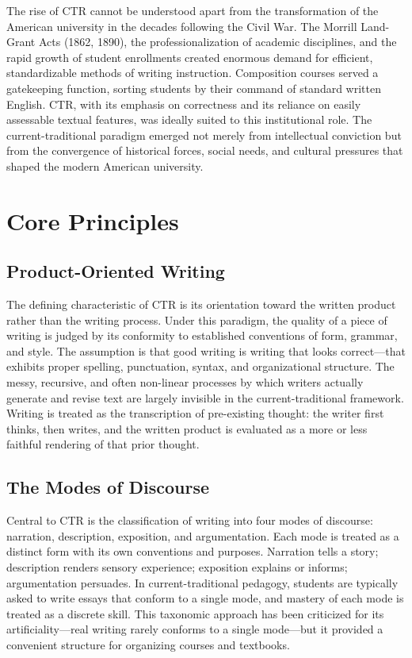 \documentclass[12pt]{article}
\begin{document}
The rise of CTR cannot be understood apart from the transformation of the American university in the decades following the Civil War. The Morrill Land-Grant Acts (1862, 1890), the professionalization of academic disciplines, and the rapid growth of student enrollments created enormous demand for efficient, standardizable methods of writing instruction. Composition courses served a gatekeeping function, sorting students by their command of standard written English. CTR, with its emphasis on correctness and its reliance on easily assessable textual features, was ideally suited to this institutional role. The current-traditional paradigm emerged not merely from intellectual conviction but from the convergence of historical forces, social needs, and cultural pressures that shaped the modern American university.

\section{Core Principles}

\subsection{Product-Oriented Writing}

The defining characteristic of CTR is its orientation toward the written product rather than the writing process. Under this paradigm, the quality of a piece of writing is judged by its conformity to established conventions of form, grammar, and style. The assumption is that good writing is writing that looks correct---that exhibits proper spelling, punctuation, syntax, and organizational structure. The messy, recursive, and often non-linear processes by which writers actually generate and revise text are largely invisible in the current-traditional framework. Writing is treated as the transcription of pre-existing thought: the writer first thinks, then writes, and the written product is evaluated as a more or less faithful rendering of that prior thought.

\subsection{The Modes of Discourse}

Central to CTR is the classification of writing into four modes of discourse: narration, description, exposition, and argumentation. Each mode is treated as a distinct form with its own conventions and purposes. Narration tells a story; description renders sensory experience; exposition explains or informs; argumentation persuades. In current-traditional pedagogy, students are typically asked to write essays that conform to a single mode, and mastery of each mode is treated as a discrete skill. This taxonomic approach has been criticized for its artificiality---real writing rarely conforms to a single mode---but it provided a convenient structure for organizing courses and textbooks.
\end{document}
